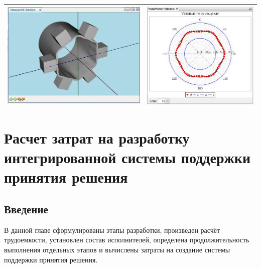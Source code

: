 \documentclass[14pt,oneside,final]{extreport}
\begin{document}
\begin{table}[]
{{\begin{tabu}[]{|c|c|}
						\includegraphics[scale=0.55]{img/simulation-jaw-test-model2} & \includegraphics[scale=0.55]{img/simulation-jaw-test-graph2}  \\ 
						\hline
					\end{tabu}
				}
			}\end{table}


	\chapter{Расчет затрат на разработку интегрированной системы поддержки принятия решения}
	\section{Введение}
	В данной главе сформулированы этапы разработки, произведен расчёт трудоемкости, установлен состав исполнителей, определена продолжительность выполнения отдельных этапов и вычислены затраты на создание системы поддержки принятия решения.	
	
\end{document}
